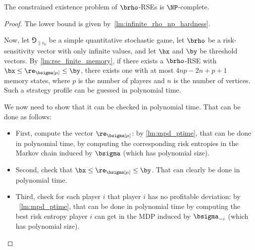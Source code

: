 


\begin{theorem}
    The constrained existence problem of $\brho$-RSEs is $\NP$-complete.
\end{theorem}

\begin{proof}
    The lower bound is given by~\cref{lm:infinite_rho_np_hardness}.

    Now, let $\Game_{\|v_0}$ be a simple quantitative stochastic game, let $\brho$ be a risk-sensitivity vector with only infinite values, and let $\bx$ and $\by$ be threshold vectors.
    By \cref{lm:rse_finite_memory}, if there exists a $\brho$-RSE with $\bx \leq \re_\bsigma[\mu] \leq \by$, there exists one with at most $4np-2n+p+1$ memory states, where $p$ is the number of players and $n$ is the number of vertices.
    Such a strategy profile can be guessed in polynomial time.
    
    We now need to show that it can be checked in polynomial time.
    That can be done as follows:
    \begin{itemize}
        \item First, compute the vector $\re_\bsigma[\mu]$: by \cref{lm:mpd_ptime}, that can be done in polynomial time, by computing the corresponding risk entropies in the Markov chain induced by $\bsigma$ (which has polynomial size).

        \item Second, check that $\bx \leq \re_\bsigma[\mu] \leq \by$.
        That can clearly be done in polynomial time.

        \item Third, check for each player $i$ that player $i$ has no profitable deviation: by ~\cref{lm:mpd_ptime}, that can be done in polynomial time by computing the best risk entropy player $i$ can get in the MDP induced by $\bsigma_{-i}$ (which has polynomial size).
    \end{itemize}
\end{proof}


